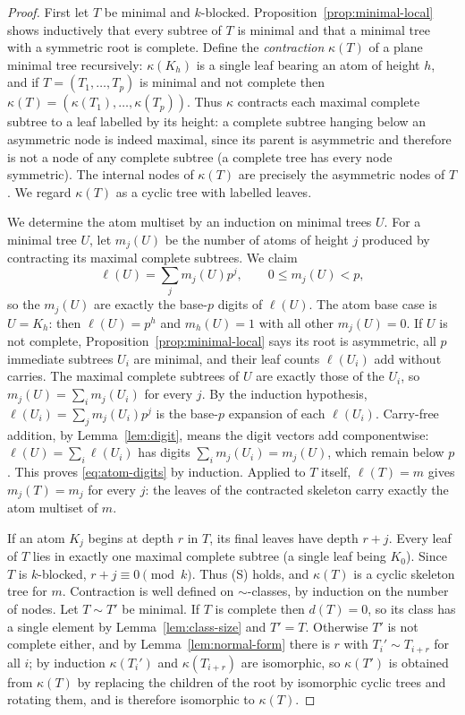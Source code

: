 \documentclass[11pt]{amsart}
\theoremstyle{definition}
\theoremstyle{remark}
\begin{document}
\begin{proof}
First let $T$ be minimal and $k$-blocked.  Proposition~\ref{prop:minimal-local} shows inductively that every subtree of $T$ is minimal and that a minimal tree with a symmetric root is complete.  Define the \emph{contraction} $\kappa(T)$ of a plane minimal tree recursively: $\kappa(K_h)$ is a single leaf bearing an atom of height $h$, and if $T=(T_1,\ldots,T_p)$ is minimal and not complete then $\kappa(T)=(\kappa(T_1),\ldots,\kappa(T_p))$.  Thus $\kappa$ contracts each maximal complete subtree to a leaf labelled by its height: a complete subtree hanging below an asymmetric node is indeed maximal, since its parent is asymmetric and therefore is not a node of any complete subtree (a complete tree has every node symmetric).  The internal nodes of $\kappa(T)$ are precisely the asymmetric nodes of $T$.  We regard $\kappa(T)$ as a cyclic tree with labelled leaves.

We determine the atom multiset by an induction on minimal trees $U$.  For a minimal tree $U$, let $m_j(U)$ be the number of atoms of height $j$ produced by contracting its maximal complete subtrees.  We claim
\begin{equation}\label{eq:atom-digits}
 \ell(U)=\sum_j m_j(U)p^j,\qquad 0\le m_j(U)<p,
\end{equation}
so the $m_j(U)$ are exactly the base-$p$ digits of $\ell(U)$.  The atom base case is $U=K_h$: then $\ell(U)=p^h$ and $m_h(U)=1$ with all other $m_j(U)=0$.  If $U$ is not complete, Proposition~\ref{prop:minimal-local} says its root is asymmetric, all $p$ immediate subtrees $U_i$ are minimal, and their leaf counts $\ell(U_i)$ add without carries.  The maximal complete subtrees of $U$ are exactly those of the $U_i$, so $m_j(U)=\sum_i m_j(U_i)$ for every $j$.  By the induction hypothesis, $\ell(U_i)=\sum_j m_j(U_i)p^j$ is the base-$p$ expansion of each $\ell(U_i)$.  Carry-free addition, by Lemma~\ref{lem:digit}, means the digit vectors add componentwise: $\ell(U)=\sum_i\ell(U_i)$ has digits $\sum_i m_j(U_i)=m_j(U)$, which remain below $p$.  This proves \eqref{eq:atom-digits} by induction.  Applied to $T$ itself, $\ell(T)=m$ gives $m_j(T)=m_j$ for every $j$: the leaves of the contracted skeleton carry exactly the atom multiset of $m$.

If an atom $K_j$ begins at depth $r$ in $T$, its final leaves have depth $r+j$.  Every leaf of $T$ lies in exactly one maximal complete subtree (a single leaf being $K_0$).  Since $T$ is $k$-blocked, $r+j\equiv0\pmod k$.  Thus (S) holds, and $\kappa(T)$ is a cyclic skeleton tree for $m$.  Contraction is well defined on $\sim$-classes, by induction on the number of nodes.  Let $T\sim T'$ be minimal.  If $T$ is complete then $d(T)=0$, so its class has a single element by Lemma~\ref{lem:class-size} and $T'=T$.  Otherwise $T'$ is not complete either, and by Lemma~\ref{lem:normal-form} there is $r$ with $T_i'\sim T_{i+r}$ for all $i$; by induction $\kappa(T_i')$ and $\kappa(T_{i+r})$ are isomorphic, so $\kappa(T')$ is obtained from $\kappa(T)$ by replacing the children of the root by isomorphic cyclic trees and rotating them, and is therefore isomorphic to $\kappa(T)$.


\end{proof}
\end{document}
